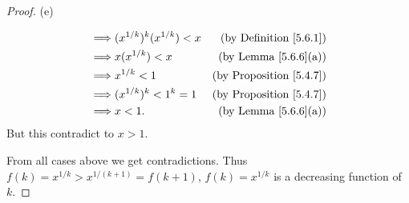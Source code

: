\begin{proof}{(e)}
\begin{enumerate}[label=(\Roman*)]
\begin{align*}
                  \implies & (x^{1 / k})^k (x^{1 / k}) < x                       & \text{(by Definition \ref{5.6.1})}  \\
                  \implies & x (x^{1 / k}) < x                                   & \text{(by Lemma \ref{5.6.6}(a))}    \\
                  \implies & x^{1 / k} < 1                                       & \text{(by Proposition \ref{5.4.7})} \\
                  \implies & (x^{1 / k})^k < 1^k = 1                             & \text{(by Proposition \ref{5.4.7})} \\
                  \implies & x < 1.                                              & \text{(by Lemma \ref{5.6.6}(a))}
              \end{align*}
              But this contradict to \(x > 1\).
    \end{enumerate}
    From all cases above we get contradictions.
    Thus \(f(k) = x^{1 / k} > x^{1 / (k + 1)} = f(k + 1)\), \(f(k) = x^{1 / k}\) is a decreasing function of \(k\).


\end{proof}
